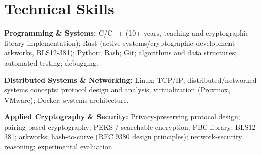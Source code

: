 \section{Technical Skills}

\textbf{Programming \& Systems:} C/C++ (10+ years, teaching and cryptographic-library implementation); Rust (active systems/cryptographic development -- arkworks, BLS12-381); Python; Bash; Git; algorithms and data structures; automated testing; debugging.

\textbf{Distributed Systems \& Networking:} Linux; TCP/IP; distributed/networked systems concepts; protocol design and analysis; virtualization (Proxmox, VMware); Docker; systems architecture.

\textbf{Applied Cryptography \& Security:} Privacy-preserving protocol design; pairing-based cryptography; PEKS / searchable encryption; PBC library; BLS12-381; arkworks; hash-to-curve (RFC 9380 design principles); network-security reasoning; experimental evaluation.
